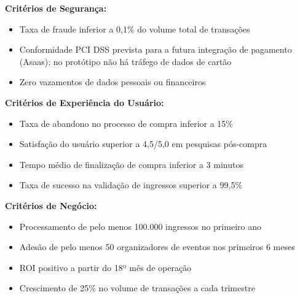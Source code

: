 \textbf{Critérios de Segurança:}
\begin{itemize}
    \item Taxa de fraude inferior a 0,1\% do volume total de transações
    \item Conformidade PCI DSS prevista para a futura integração de pagamento (Asaas); no protótipo não há tráfego de dados de cartão
    \item Zero vazamentos de dados pessoais ou financeiros
\end{itemize}

\textbf{Critérios de Experiência do Usuário:}
\begin{itemize}
    \item Taxa de abandono no processo de compra inferior a 15\%
    \item Satisfação do usuário superior a 4,5/5,0 em pesquisas pós-compra
    \item Tempo médio de finalização de compra inferior a 3 minutos
    \item Taxa de sucesso na validação de ingressos superior a 99,5\%
\end{itemize}

\textbf{Critérios de Negócio:}
\begin{itemize}
    \item Processamento de pelo menos 100.000 ingressos no primeiro ano
    \item Adesão de pelo menos 50 organizadores de eventos nos primeiros 6 meses
    \item ROI positivo a partir do 18º mês de operação
    \item Crescimento de 25\% no volume de transações a cada trimestre
\end{itemize}
